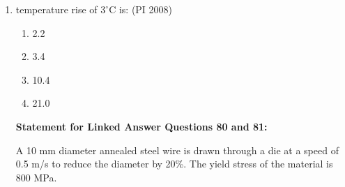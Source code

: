 \documentclass[journal,12pt,onecolumn]{IEEEtran}
\theoremstyle{remark}
\begin{document}
\begin{enumerate}
\begin{multicols}{4}
\begin{enumerate}
 \end{enumerate}
\end{multicols}
\vspace{1cm}

\section*{Statement for Linked Answer Questions 78 and 79:}

A disk brake has two friction linings with the outside-lining and inside-lining diameters as 120 mm and 60 mm, respectively.  
The coefficient of friction at the interface of lining and rotating part is 0.35.  
A 10 kN axial force is applied to stop the part rotating at 8000 rpm.  
To cool the disk brake, an arrangement of circulating the water (specific heat 4.2 kJ/kg$^\circ$C) is made.  
Assume uniform wear rate of disk linings and heat transfer by convection only.


\textbf{Q.78} The torque (in N·m) applied by the brake on the rotating part is:\hfill{(PI 2008)} 
\begin{multicols}{4}
    \begin{enumerate}
\item  215  
\item 315 
\item 630 
\item 1260

 \end{enumerate}
\end{multicols}
\vspace{1cm}


\item %
temperature rise of $3^\circ$C is:
\hfill{(PI 2008)}
\begin{multicols}{4}
    \begin{enumerate}
\item  2.2 
\item 3.4  
\item 10.4  
\item 21.0

 \end{enumerate}
\end{multicols}
\vspace{1cm}

\textbf{Statement for Linked Answer Questions 80 and 81:}

A 10 mm diameter annealed steel wire is drawn through a die at a speed of 0.5 m/s to reduce the diameter by 20\%.  
The yield stress of the material is 800 MPa.


\end{enumerate}
\end{document}
